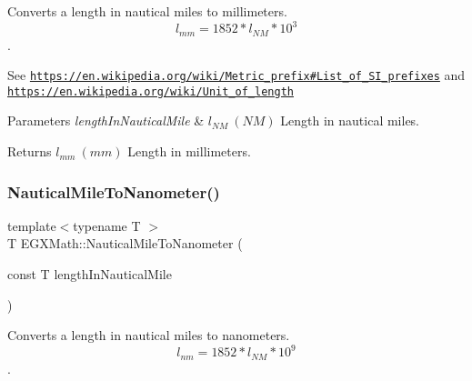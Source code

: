 Converts a length in nautical miles to millimeters. \[ l_{mm}=1852 * l_{NM} * 10^{3} \]. 

See \href{https://en.wikipedia.org/wiki/Metric_prefix#List_of_SI_prefixes}{\tt https\+://en.\+wikipedia.\+org/wiki/\+Metric\+\_\+prefix\#\+List\+\_\+of\+\_\+\+S\+I\+\_\+prefixes} and \href{https://en.wikipedia.org/wiki/Unit_of_length}{\tt https\+://en.\+wikipedia.\+org/wiki/\+Unit\+\_\+of\+\_\+length} 
\begin{DoxyParams}{Parameters}
{\em length\+In\+Nautical\+Mile} & $ l_{NM}\ (NM)$ Length in nautical miles. \\
\hline
\end{DoxyParams}
\begin{DoxyReturn}{Returns}
$ l_{mm}\ (mm)$ Length in millimeters. 
\end{DoxyReturn}
\mbox{\label{group___e_g_x_math-_conversions-_length_conversions-_nautical-_nautical_mile-_s_i_ga914f8e21cf415b90729304b19eec1f05}} 
\subsubsection{\texorpdfstring{Nautical\+Mile\+To\+Nanometer()}{NauticalMileToNanometer()}}
{\footnotesize\ttfamily template$<$typename T $>$ \\
T E\+G\+X\+Math\+::\+Nautical\+Mile\+To\+Nanometer (\begin{DoxyParamCaption}\item[{const T}]{length\+In\+Nautical\+Mile }\end{DoxyParamCaption})}



Converts a length in nautical miles to nanometers. \[ l_{nm}=1852 * l_{NM} * 10^{9} \]. 

